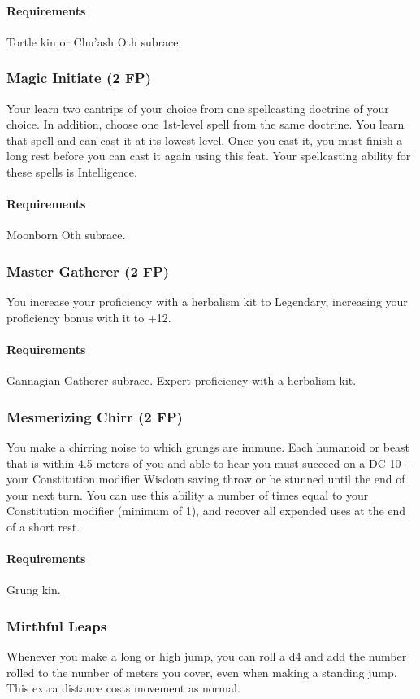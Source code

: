     \paragraph{Requirements} Tortle kin or Chu'ash Oth subrace.
\subsubsection{Magic Initiate (2 FP)} \label{feat::magicinitiate}
    Your learn two cantrips of your choice from one spellcasting doctrine of your choice.
    In addition, choose one 1st-level spell from the same doctrine.
    You learn that spell and can cast it at its lowest level.
    Once you cast it, you must finish a long rest before you can cast it again using this feat.
    Your spellcasting ability for these spells is Intelligence.
    \paragraph{Requirements} Moonborn Oth subrace.
\subsubsection{Master Gatherer (2 FP)} \label{feat::mastergatherer}
    You increase your proficiency with a herbalism kit to Legendary, increasing your proficiency bonus with it to +12.
    \paragraph{Requirements} Gannagian Gatherer subrace. Expert proficiency with a herbalism kit.
\subsubsection{Mesmerizing Chirr (2 FP)} \label{feat::mesmerizingchirr}
    You make a chirring noise to which grungs are immune.
    Each humanoid or beast that is within 4.5 meters of you and able to hear you must succeed on a DC 10 + your Constitution modifier Wisdom saving throw or be stunned until the end of your next turn.
    You can use this ability a number of times equal to your Constitution modifier (minimum of 1), and recover all expended uses at the end of a short rest.
    \paragraph{Requirements} Grung kin.
\subsubsection{Mirthful Leaps} \label{feat::mirthfulleaps}
    Whenever you make a long or high jump, you can roll a d4 and add the number rolled to the number of meters you cover, even when making a standing jump.
    This extra distance costs movement as normal.
